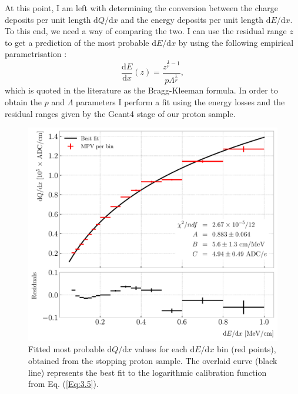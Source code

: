 At this point, I am left with determining the conversion between the charge deposits per unit length $\mathrm{d}Q/\mathrm{d}x$ and the energy deposits per unit length $\mathrm{d}E/\mathrm{d}x$. To this end, we need a way of comparing the two. I can use the residual range $z$ to get a prediction of the most probable $\mathrm{d}E/\mathrm{d}x$ by using the following empirical parametrisation \cite{Ulmer2010}:
\begin{equation}\label{Eq:3.4}
	\frac{\mathrm{d}E}{\mathrm{d}x}(z) = \frac{z^{\frac{1}{p}-1}}{p\Lambda^{\frac{1}{p}}},
\end{equation}
which is quoted in the literature as the Bragg-Kleeman formula. In order to obtain the $p$ and $\Lambda$ parameters I perform a fit using the energy losses and the residual ranges given by the Geant4 stage of our proton sample.

\begin{figure}[t]
	\centering
	\includegraphics[width=.85\linewidth]{Images/GArSoft_PID/dEdx/dEdx_vs_dQdx_log_fit.pdf}
	\caption{Fitted most probable $\mathrm{d}Q/\mathrm{d}x$ values for each $\mathrm{d}E/\mathrm{d}x$ bin (red points), obtained from the stopping proton sample. The overlaid curve (black line) represents the best fit to the logarithmic calibration function from Eq. (\ref{Eq:3.5}).}
	\label{fig:energy_calibration}
\end{figure}

